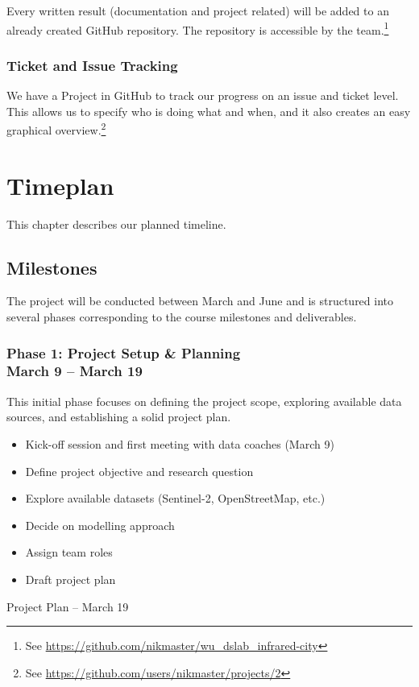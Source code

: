 \documentclass[12pt]{article}
\begin{document}
Every written result (documentation and project related) will be added to an already created GitHub repository. The repository is accessible by the team.\footnote{See \url{https://github.com/nikmaster/wu_dslab_infrared-city}}

\subsubsection{Ticket and Issue Tracking}

We have a Project in GitHub to track our progress on an issue and ticket level. This allows us to specify who is doing what and when, and it also creates an easy graphical overview.\footnote{See \url{https://github.com/users/nikmaster/projects/2}}

\section{Timeplan}

This chapter describes our planned timeline.

\subsection{Milestones}

The project will be conducted between March and June and is structured into several phases corresponding to the course milestones and deliverables.

\subsubsection[Phase 1: Project Setup \& Planning]{Phase 1: Project Setup \& Planning \\ \normalsize March 9 – March 19}
This initial phase focuses on defining the project scope, exploring available data sources, and establishing a solid project plan.

\begin{description}[style=multiline, leftmargin=3cm, font=\normalfont\textbf]
    \item[Tasks:] 
    \begin{itemize}[nosep, leftmargin=*]
        \item Kick-off session and first meeting with data coaches (March 9)
        \item Define project objective and research question
        \item Explore available datasets (Sentinel-2, OpenStreetMap, etc.)
        \item Decide on modelling approach
        \item Assign team roles
        \item Draft project plan
    \end{itemize}
    \item[Deliverable:] Project Plan -- March 19
\end{description}
\end{document}
